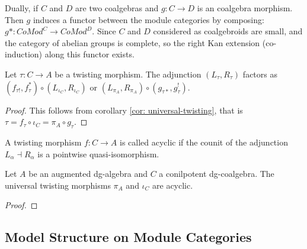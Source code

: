 \documentclass[../thesis.tex]{subfiles}
\begin{document}
            Dually, if $C$ and $D$ are two coalgebras and $g : C \rightarrow D$ is an coalgebra morphism. Then $g$ induces a functor between the module categories by composing: $g* : CoMod^C \rightarrow CoMod^D$. Since $C$ and $D$ considered as coalgebroids are small, and the category of abelian groups is complete, so the right Kan extension (co-induction) along this functor exists.
            \begin{center}
            \end{center}

            \begin{lemma}
                Let $\tau : C \rightarrow A$ be a twisting morphism. The adjunction $(L_\tau, R_\tau)$ factors as $(f_{\tau !}, f_\tau^*)\circ (L_{\iota_C},R_{\iota_C})$ or $(L_{\pi_A},R_{\pi_A})\circ (g_{\tau *}, g_\tau^!)$.
            \end{lemma}

            \begin{proof}
                This follows from corollary \ref{cor: universal-twisting}, that is $\tau = f_\tau \circ \iota_C = \pi_A\circ g_\tau$.
            \end{proof}

            \begin{definition}
                A twisting morphism $f: C \rightarrow A$ is called acyclic if the counit of the adjunction $L_\alpha \dashv R_\alpha$ is a pointwise quasi-isomorphism.
            \end{definition}

            \begin{lemma}
                Let $A$ be an augmented dg-algebra and $C$ a conilpotent dg-coalgebra. The universal twisting morphisms $\pi_A$ and $\iota_C$ are acyclic.
            \end{lemma}

            \begin{proof}
                
            \end{proof}

        \subsection{Model Structure on Module Categories}
\end{document}
